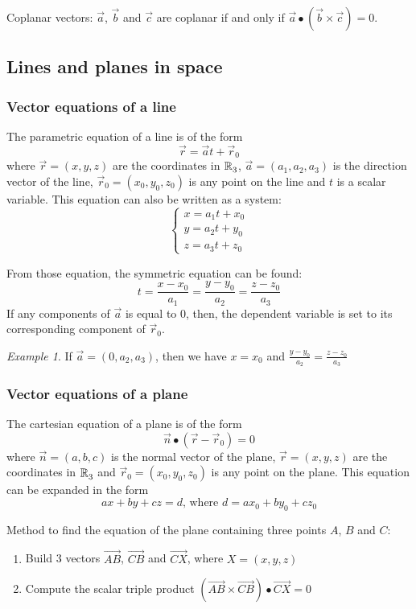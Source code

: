 \documentclass[10pt, twocolumn]{article}
\theoremstyle{remark}
\newtheorem*{example}{Example}
\begin{document}
Coplanar vectors: \(\vec{a}\), \(\vec{b}\) and \(\vec{c}\) are coplanar if and only if \(\vec{a} \bullet (\vec{b} \times \vec{c}) = 0\).


\subsection{Lines and planes in space}
\subsubsection*{Vector equations of a line}
The parametric equation of a line is of the form
\[
  \vec{r} = \vec{a}t + \vec{r}_0
\]
where \(\vec{r} = (x, y, z)\) are the coordinates in \(\mathbb{R}_{3}^{}\), \(\vec{a} = (a_1 , a_2 , a_3 )\) is the direction vector of the line, \(\vec{r}_0 = (x_0 , y_0 , z_0 )\) is any point on the line and \(t\) is a scalar variable.
This equation can also be written as a system:
\[
  \begin{cases}
    x = a_1 t + x_0 \\
    y = a_2 t + y_0 \\
    z = a_3 t + z_0
  \end{cases}
\]

From those equation, the symmetric equation can be found:
\[
  t = \frac{x - x_0 }{a_1 } = \frac{y - y_0 }{a_2 } = \frac{z - z_0 }{a_3 }
\]
If any components of \(\vec{a}\) is equal to 0, then, the dependent variable is set to its corresponding component of \(\vec{r}_0 \).
\begin{example}
  If \(\vec{a} = (0, a_2 , a_3 )\), then we have \(x = x_0 \) and \(\frac{y - y_0 }{a_2 } = \frac{z - z_0 }{a_3 }\)
\end{example}

\subsubsection*{Vector equations of a plane}
The cartesian equation of a plane is of the form
\[
  \vec{n} \bullet \left( \vec{r} - \vec{r}_0 \right) = 0
\]
where \(\vec{n} = (a, b, c)\) is the normal vector of the plane, \(\vec{r} = (x, y, z)\) are the coordinates in \(\mathbb{R}_{3}^{}\) and \(\vec{r}_0 = (x_0 , y_0 , z_0 )\) is any point on the plane.
This equation can be expanded in the form
\[
  ax + by + cz = d \text{, where } d = ax_0 + by_0 + cz_0
\]

Method to find the equation of the plane containing three points \(A\), \(B\) and \(C\):
\begin{enumerate}
  \item Build 3 vectors \(\Vec{AB}\), \(\Vec{CB}\) and \(\Vec{CX}\), where \(X = (x, y, z)\)
  \item Compute the scalar triple product \((\Vec{AB} \times \Vec{CB}) \bullet \Vec{CX} = 0\)
\end{enumerate}
\end{document}
